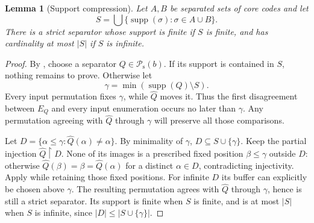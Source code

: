 \documentclass[11pt]{article}
\newtheorem{lemma}[lemma]{Lemma}
\theoremstyle{definition}
\theoremstyle{remark}
\newcommand{\Psupp}{\mathcal P_{\mathrm{s}}}
\newcommand{\supp}{\operatorname{supp}}
\newcommand{\res}{\mathbin{\upharpoonright}}
\begin{document}
\begin{lemma}[Support compression]\label{swo:tc:lem:compression}
Let $A,B$ be separated sets of core codes and let
\[
 S=\bigcup\{\supp(\sigma):\sigma\in A\cup B\}.
\]
There is a strict separator whose support is finite if $S$ is finite,
and has cardinality at most $|S|$ if $S$ is infinite.
\end{lemma}
\begin{proof}
By , choose a separator $Q\in \Psupp(b)$.
If its support is contained in $S$, nothing remains to prove.
Otherwise let
\[
 \gamma=\min(\supp(Q)\setminus S).
\]
Every input permutation fixes $\gamma$, while $\widehat Q$ moves it.
Thus the first disagreement between $E_Q$ and every input enumeration
occurs no later than $\gamma$. Any permutation agreeing with
$\widehat Q$ through $\gamma$ will preserve all those comparisons.

Let $D=\{\alpha\le\gamma:\widehat Q(\alpha)\ne\alpha\}$.
By minimality of $\gamma$, $D\subseteq S\cup\{\gamma\}$. Keep the
partial injection $\widehat Q\res D$. None of its images is a
prescribed fixed position $\beta\le\gamma$ outside $D$: otherwise
$\widehat Q(\beta)=\beta=\widehat Q(\alpha)$ for a distinct
$\alpha\in D$, contradicting injectivity. Apply
 while retaining those fixed positions.
For infinite $D$ its buffer can explicitly be chosen above $\gamma$.
The resulting permutation agrees with $\widehat Q$ through $\gamma$,
hence is still a strict separator. Its support is finite when $S$ is
finite, and is at most $|S|$ when $S$ is infinite, since
$|D|\le|S\cup\{\gamma\}|$.
\end{proof}
\end{document}
